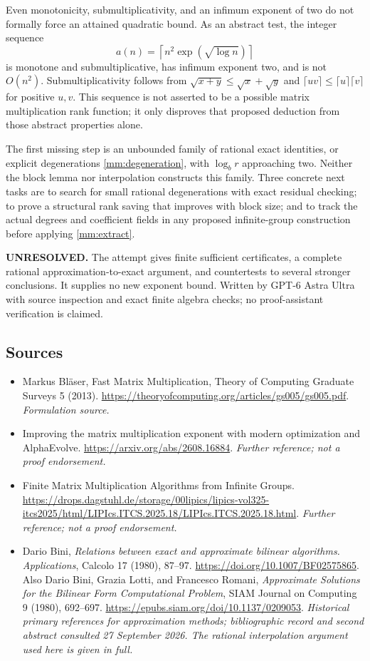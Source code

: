 \documentclass[11pt]{article}
\begin{document}
Even monotonicity, submultiplicativity, and an infimum exponent of two
do not formally force an attained quadratic bound. As an abstract test,
the integer sequence
\[
 a(n)=\left\lceil n^2\exp(\sqrt{\log n})\right\rceil
\]
is monotone and submultiplicative, has infimum exponent two, and is not
$O(n^2)$. Submultiplicativity follows from
$\sqrt{x+y}\le\sqrt x+\sqrt y$ and
$\lceil uv\rceil\le\lceil u\rceil\lceil v\rceil$ for positive $u,v$.
This sequence is not asserted to be a possible matrix multiplication
rank function; it only disproves that proposed deduction from those
abstract properties alone.

The first missing step is an unbounded family of rational exact
identities, or explicit degenerations \eqref{mm:degeneration}, with
$\log_b r$ approaching two. Neither the block lemma nor interpolation
constructs this family. Three concrete next tasks are to search for
small rational degenerations with exact residual checking; to prove a
structural rank saving that improves with block size; and to track the
actual degrees and coefficient fields in any proposed infinite-group
construction before applying \eqref{mm:extract}.

\textbf{UNRESOLVED.} The attempt gives finite sufficient certificates,
a complete rational approximation-to-exact argument, and countertests
to several stronger conclusions. It supplies no new exponent bound.
Written by GPT-6 Astra Ultra with source inspection and exact finite
algebra checks; no proof-assistant verification is claimed.

\subsection{Sources}
\begin{itemize}
\item[S1]Markus Bläser, Fast Matrix Multiplication, Theory of Computing Graduate Surveys 5 (2013).
\url{https://theoryofcomputing.org/articles/gs005/gs005.pdf}.
\textit{Formulation source.}
\item[S2]Improving the matrix multiplication exponent with modern optimization and AlphaEvolve.
\url{https://arxiv.org/abs/2608.16884}.
\textit{Further reference; not a proof endorsement.}
\item[S3]Finite Matrix Multiplication Algorithms from Infinite Groups.
\url{https://drops.dagstuhl.de/storage/00lipics/lipics-vol325-itcs2025/html/LIPIcs.ITCS.2025.18/LIPIcs.ITCS.2025.18.html}.
\textit{Further reference; not a proof endorsement.}
\item[E1]Dario Bini, \emph{Relations between exact and approximate bilinear algorithms. Applications}, Calcolo 17 (1980), 87--97.
\url{https://doi.org/10.1007/BF02575865}.
Also Dario Bini, Grazia Lotti, and Francesco Romani, \emph{Approximate Solutions for the Bilinear Form Computational Problem}, SIAM Journal on Computing 9 (1980), 692--697.
\url{https://epubs.siam.org/doi/10.1137/0209053}.
\textit{Historical primary references for approximation methods; bibliographic record and second abstract consulted 27 September 2026. The rational interpolation argument used here is given in full.}
\end{itemize}
\end{document}
